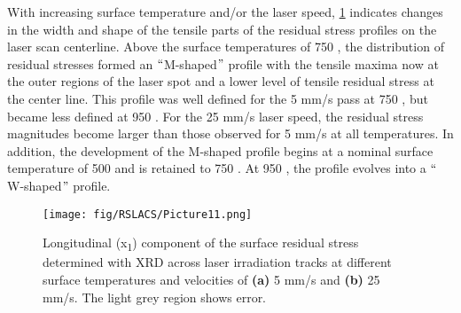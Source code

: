 		
		
		
		With increasing surface temperature and/or the laser speed, \ref{fig:RSLACS11} indicates changes in the width and shape of the tensile parts of the residual stress profiles on the laser scan centerline. Above the surface temperatures of 750 \celsius{}, the distribution of residual stresses formed an $``$M-shaped$"$  profile with the tensile maxima now at the outer regions of the laser spot and a lower level of tensile residual stress at the center line. This profile was well defined for the 5 mm/s pass at 750 \celsius{}, but became less defined at 950 \celsius{}. For the 25 mm/s laser speed, the residual stress magnitudes become larger than those observed for 5 mm/s at all temperatures. In addition, the development of the M-shaped profile begins at a nominal surface temperature of 500 \celsius{} and is retained to 750 \celsius{}. At 950 \celsius{}, the profile evolves into a $``$W-shaped$"$  profile. 
		
		
		\begin{figure}
			\centering
			\texttt{[image: fig/RSLACS/Picture11.png]}
			\caption[Longitudinal (x\textsubscript{1})\textsubscript{ }component of the surface residual stress determined with XRD across laser irradiation tracks at different surface temperatures and velocities of \textbf{(a)} 5 mm/s and \textbf{(b)} 25 mm/s.]{Longitudinal (x\textsubscript{1})\textsubscript{ }component of the surface residual stress determined with XRD across laser irradiation tracks at different surface temperatures and velocities of \textbf{(a)} 5 mm/s and \textbf{(b)} 25 mm/s. The light grey region shows error.}
			\label{fig:RSLACS11}
		\end{figure}

		
		
